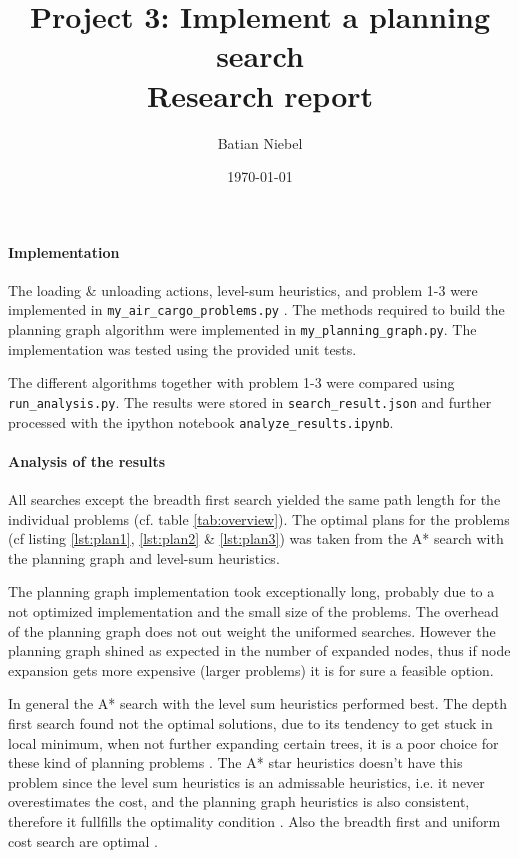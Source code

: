 \documentclass{article}
\begin{document}
\title{Project 3: Implement a planning search  \\ Research report}
\author{Batian Niebel}
\date{\today}
\maketitle

\paragraph*{Implementation}
The loading \& unloading actions, level-sum heuristics, and problem 1-3 were
implemented in \texttt{my\_air\_cargo\_problems.py} . The methods required to
build the planning graph algorithm were implemented in
\texttt{my\_planning\_graph.py}. The implementation was tested using the
provided unit tests.

The different algorithms together with problem 1-3 were compared using
\texttt{run\_analysis.py}. The results were stored in
\texttt{search\_result.json} and further processed with the ipython notebook
\texttt{analyze\_results.ipynb}.

\paragraph*{Analysis of the results}
All searches except the breadth first search yielded the same path length for
the individual problems (cf. table \ref{tab:overview}). The optimal plans for
the problems (cf listing \ref{lst:plan1}, \ref{lst:plan2} \& \ref{lst:plan3}) was taken from
the A* search with the planning graph and level-sum heuristics.

The planning graph implementation took exceptionally long, probably due to a not
optimized implementation and the small size of the problems. The overhead of the
planning graph does not out weight the uniformed searches. However the planning
graph shined as expected in the number of expanded nodes, thus if node
expansion gets more expensive (larger problems) it is for sure a feasible
option.

In general the A* search with the level sum heuristics performed best. The depth first search
found not the optimal solutions, due to its tendency to get stuck in local
minimum, when not further expanding certain trees, it is a poor choice for these
kind of planning problems \cite{russell_92}. The A* star heuristics doesn't have
this problem since the level sum heuristics is an admissable heuristics, i.e. it never
overestimates the cost, and the planning graph heuristics is also consistent,
therefore it fullfills the optimality condition \cite{russell_94}. Also the
breadth first and uniform cost search are optimal \cite{russell_92}.
\end{document}
